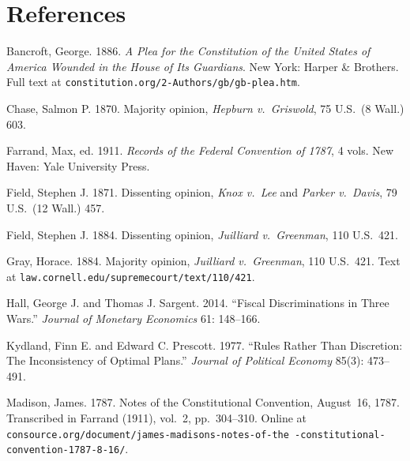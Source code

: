 \documentclass[12pt]{article}
\begin{document}
\section*{References}

\begin{description}
\setlength\itemsep{0.5em}

\item Bancroft, George. 1886. \textit{A Plea for the Constitution of
the United States of America Wounded in the House of Its Guardians}.
New York: Harper \& Brothers. Full text at
\texttt{constitution.org/2-Authors/gb/gb-plea.htm}.

\item Chase, Salmon P. 1870. Majority opinion, \textit{Hepburn v.\
Griswold}, 75 U.S.\ (8 Wall.) 603.

\item Farrand, Max, ed. 1911. \textit{Records of the Federal Convention
of 1787}, 4 vols. New Haven: Yale University Press.

\item Field, Stephen J. 1871. Dissenting opinion, \textit{Knox v.\ Lee}
and \textit{Parker v.\ Davis}, 79 U.S.\ (12 Wall.) 457.

\item Field, Stephen J. 1884. Dissenting opinion, \textit{Juilliard
v.\ Greenman}, 110 U.S.\ 421.

\item Gray, Horace. 1884. Majority opinion, \textit{Juilliard
v.\ Greenman}, 110 U.S.\ 421. Text at
\texttt{law.cornell.edu/supremecourt/text/110/421}.

\item Hall, George J. and Thomas J. Sargent. 2014. ``Fiscal
Discriminations in Three Wars.'' \textit{Journal of Monetary Economics}
61: 148--166.

\item Kydland, Finn E. and Edward C. Prescott. 1977. ``Rules Rather
Than Discretion: The Inconsistency of Optimal Plans.''
\textit{Journal of Political Economy} 85(3): 473--491.

\item Madison, James. 1787. Notes of the Constitutional Convention,
August~16, 1787. Transcribed in Farrand (1911), vol.~2, pp.~304--310.
Online at \texttt{consource.org/document/james-madisons-notes-of-the%
-constitutional-convention-1787-8-16/}.


\end{description}
\end{document}

